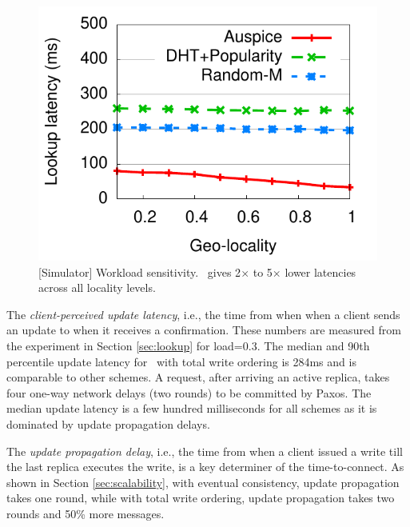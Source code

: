 {\begin{figure}[t]
\includegraphics[scale=0.5]{graph/medianlatencyVSlocality.pdf}
\vspace{-0.1in}
\caption{[Simulator] Workload sensitivity. \auspice\ gives 2$\times$ to 5$\times$  lower latencies across all locality levels.}
\label{fig:varylocality}
\vspace{-0.1in}
\end{figure}

}



The {\em client-perceived update latency}, i.e., the time from when when a client sends an update to when it receives a confirmation. %
These numbers are measured from the experiment in Section \ref{sec:lookup} for load=0.3. The median and 90th percentile update latency for \auspice\ with total write ordering is 284ms and is comparable to other schemes. A request, after arriving an active replica, takes four one-way network delays (two rounds) to be committed by Paxos. The median update latency is a few hundred milliseconds for all schemes as it is dominated by update propagation delays.

The {\em update propagation delay}, i.e., the time from when a client issued a write till the last replica executes the write, is a key determiner of the time-to-connect. As shown in Section \ref{sec:scalability}, with eventual consistency, update propagation takes one round, while with total write ordering, update propagation takes two rounds and 50\% more messages.

